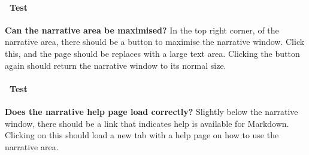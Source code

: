 \documentclass[12pt]{article}
\newcounter{Test}
\newcommand{\test}[1]{%
\stepcounter{Test}%
\paragraph{\Circle\ Test \theTest} \textbf{#1} }
\begin{document}
\test{Can the narrative area be maximised?}
In the top right corner, of the narrative area, there should be a button to maximise the narrative window. Click this, and the page should be replaces with a large text area. Clicking the button again should return the narrative window to its normal size.

\test{Does the narrative help page load correctly?}
Slightly below the narrative window, there should be a link that indicates help is available for Markdown. Clicking on this should load a new tab with a help page on how to use the narrative area.
\end{document}
